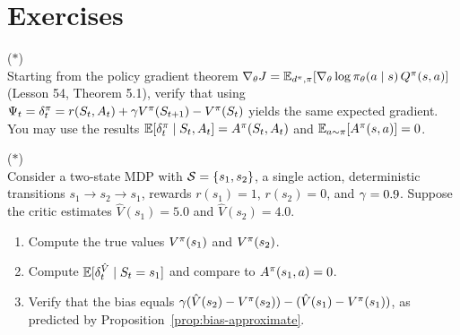 \documentclass[11pt,a4paper]{article}
\begin{document}
\section{Exercises}

\begin{exercise}
\textnormal{(\(*\))} \\
  Starting from the policy gradient theorem
  $\nabla_\theta J = \mathbb{E}_{d^\pi,\pi}[\nabla_\theta \log
  \pi_\theta(a \mid s)\, Q^{\pi}(s,a)]$
  (Lesson 54, Theorem 5.1), verify that using
  $\Psi_t = \delta_t^\pi = r(S_t, A_t) + \gamma V^{\pi}(S_{t+1})
  - V^{\pi}(S_t)$ yields the same expected gradient. You may use the
  results $\mathbb{E}[\delta_t^\pi \mid S_t, A_t] = A^\pi(S_t, A_t)$
  and $\mathbb{E}_{a \sim \pi}[A^\pi(s,a)] = 0$.
\end{exercise}

\begin{exercise}
\textnormal{(\(*\))} \\
  Consider a two-state MDP with $\mathcal{S} = \{s_1, s_2\}$, a single
  action, deterministic transitions $s_1 \to s_2 \to s_1$, rewards
  $r(s_1) = 1$, $r(s_2) = 0$, and $\gamma = 0.9$. Suppose the
  critic estimates $\hat{V}(s_1) = 5.0$ and $\hat{V}(s_2) = 4.0$.
  \begin{enumerate}[label=(\alph*)]
    \item Compute the true values $V^{\pi}(s_1)$ and $V^{\pi}(s_2)$.
    \item Compute $\mathbb{E}[\delta_t^{\hat{V}} \mid S_t = s_1]$ and compare
      to $A^\pi(s_1, a) = 0$.
    \item Verify that the bias equals $\gamma(\hat{V}(s_2) - V^{\pi}(s_2))
      - (\hat{V}(s_1) - V^{\pi}(s_1))$, as predicted by
      Proposition~\ref{prop:bias-approximate}.
  \end{enumerate}
\end{exercise}
\end{document}
